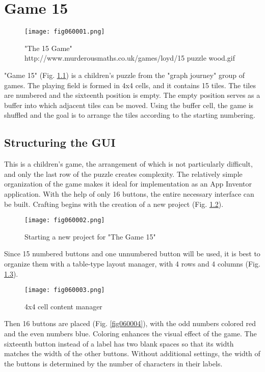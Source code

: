 ﻿\chapter{Game 15}

\begin{figure}[H]
   \centering
   \texttt{[image: fig060001.png]}
   \caption{"The 15 Game" \\ http://www.murderousmaths.co.uk/games/loyd/15 puzzle wood.gif}
\label{fig060001}
\end{figure}

"Game 15" (Fig. \ref{fig060001}) is a children's puzzle from the "graph journey" group of games. The playing field is formed in 4x4 cells, and it contains 15 tiles. The tiles are numbered and the sixteenth position is empty. The empty position serves as a buffer into which adjacent tiles can be moved. Using the buffer cell, the game is shuffled and the goal is to arrange the tiles according to the starting numbering.

\section{Structuring the GUI}

This is a children's game, the arrangement of which is not particularly difficult, and only the last row of the puzzle creates complexity. The relatively simple organization of the game makes it ideal for implementation as an App Inventor application. With the help of only 16 buttons, the entire necessary interface can be built. Crafting begins with the creation of a new project (Fig. \ref{fig060002}).

\begin{figure}[H]
   \centering
   \texttt{[image: fig060002.png]}
   \caption{Starting a new project for "The Game 15"}
\label{fig060002}
\end{figure}

Since 15 numbered buttons and one unnumbered button will be used, it is best to organize them with a table-type layout manager, with 4 rows and 4 columns (Fig. \ref{fig060003}).

\begin{figure}[H]
   \centering
   \texttt{[image: fig060003.png]}
   \caption{4x4 cell content manager}
\label{fig060003}
\end{figure}

Then 16 buttons are placed (Fig. \ref{fig060004}), with the odd numbers colored red and the even numbers blue. Coloring enhances the visual effect of the game. The sixteenth button instead of a label has two blank spaces so that its width matches the width of the other buttons. Without additional settings, the width of the buttons is determined by the number of characters in their labels.

